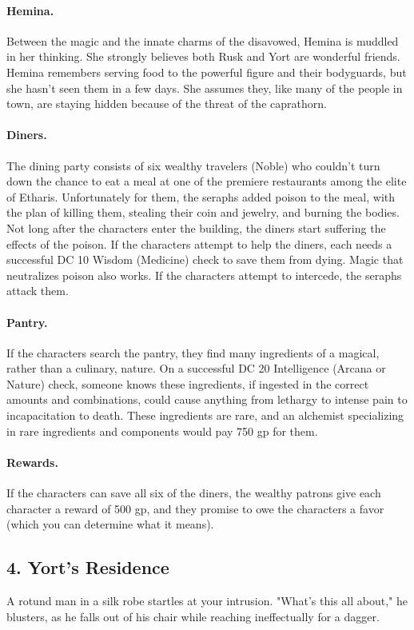 \documentclass[10pt,a4paper,twoside,twocolumn,openany,bg=print,nodeprecatedcode]{dndbook}
\begin{document}
\paragraph{Hemina.}
Between the magic and the innate charms of the disavowed, Hemina is muddled in her thinking. She strongly believes both Rusk and Yort are wonderful friends. Hemina remembers serving food to the powerful figure and their bodyguards, but she hasn't seen them in a few days. She assumes they, like many of the people in town, are staying hidden because of the threat of the caprathorn.
\paragraph{Diners.}
The dining party consists of six wealthy travelers (Noble) who couldn't turn down the chance to eat a meal at one of the premiere restaurants among the elite of Etharis. Unfortunately for them, the seraphs added poison to the meal, with the plan of killing them, stealing their coin and jewelry, and burning the bodies.
Not long after the characters enter the building, the diners start suffering the effects of the poison. If the characters attempt to help the diners, each needs a successful DC 10 Wisdom (Medicine) check to save them from dying. Magic that neutralizes poison also works. If the characters attempt to intercede, the seraphs attack them.
\paragraph{Pantry.}
If the characters search the pantry, they find many ingredients of a magical, rather than a culinary, nature. On a successful DC 20 Intelligence (Arcana or Nature) check, someone knows these ingredients, if ingested in the correct amounts and combinations, could cause anything from lethargy to intense pain to incapacitation to death. These ingredients are rare, and an alchemist specializing in rare ingredients and components would pay 750 gp for them.
\paragraph{Rewards.}
If the characters can save all six of the diners, the wealthy patrons give each character a reward of 500 gp, and they promise to owe the characters a favor (which you can determine what it means).
\subsection{4. Yort's Residence}
\begin{DndReadAloud}{}
A rotund man in a silk robe startles at your intrusion. "What's this all about," he blusters, as he falls out of his chair while reaching ineffectually for a dagger.
\end{DndReadAloud}
\end{document}
